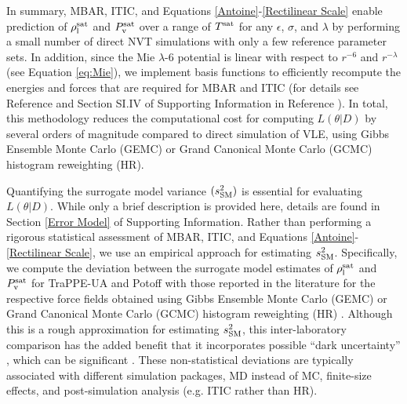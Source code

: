 \documentclass[preprint,letterpaper,floatfix,citeautoscript,aip,jcp]{revtex4-1}
\begin{document}
In summary, MBAR, ITIC, and Equations \ref{Antoine}-\ref{Rectilinear Scale} enable prediction of $\rho_{\rm l}^{\rm sat}$ and $P_{\rm v}^{\rm sat}$ over a range of $T^{\rm sat}$ for any $\epsilon$, $\sigma$, and $\lambda$ by performing a small number of direct NVT simulations with only a few reference parameter sets. In addition, since the Mie $\lambda$-6 potential is linear with respect to $r^{-6}$ and $r^{-\lambda}$ (see Equation \ref{eq:Mie}), we implement basis functions to efficiently recompute the energies and forces that are required for MBAR and ITIC (for details see Reference  and Section SI.IV of Supporting Information in Reference ). 
In total, this methodology reduces the computational cost for computing $L(\theta|D)$ by several orders of magnitude compared to direct simulation of VLE, using Gibbs Ensemble Monte Carlo (GEMC) or Grand Canonical Monte Carlo (GCMC) histogram reweighting (HR).

Quantifying the surrogate model variance $(s^2_{\rm SM})$ 
is essential for evaluating $L(\theta|D)$. While only a brief description is provided here, details are found in Section \ref{Error Model} of Supporting Information. Rather than performing a rigorous statistical assessment of MBAR, ITIC, and Equations \ref{Antoine}-\ref{Rectilinear Scale}, we use an empirical approach for estimating $s^2_{\rm SM}$. Specifically, we compute the deviation between the surrogate model estimates of $\rho_{\rm l}^{\rm sat}$ and $P_{\rm v}^{\rm sat}$ for TraPPE-UA and Potoff 
with those reported in the literature for the respective force fields obtained using Gibbs Ensemble Monte Carlo (GEMC) or Grand Canonical Monte Carlo (GCMC) histogram reweighting (HR) \cite{TraPPE,Mie}. Although this is a rough approximation for estimating $s^2_{\rm SM}$, this inter-laboratory comparison has the added benefit that it incorporates possible ``dark uncertainty'' \cite{GUM}, which can be significant \cite{RoundRobin}. These non-statistical deviations are typically associated with different simulation packages, MD instead of MC, finite-size effects, and post-simulation analysis (e.g. ITIC rather than HR). 
\end{document}
